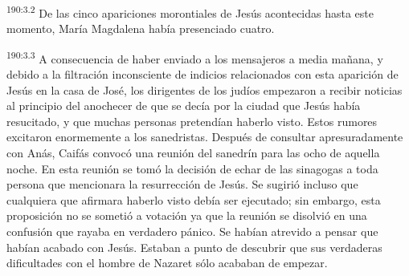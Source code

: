 \par 
\textsuperscript{190:3.2} De las cinco apariciones morontiales de Jesús acontecidas hasta este momento, María Magdalena había presenciado cuatro.

\par 
\textsuperscript{190:3.3} A consecuencia de haber enviado a los mensajeros a media mañana, y debido a la filtración inconsciente de indicios relacionados con esta aparición de Jesús en la casa de José, los dirigentes de los judíos empezaron a recibir noticias al principio del anochecer de que se decía por la ciudad que Jesús había resucitado, y que muchas personas pretendían haberlo visto. Estos rumores excitaron enormemente a los sanedristas. Después de consultar apresuradamente con Anás, Caifás convocó una reunión del sanedrín para las ocho de aquella noche. En esta reunión se tomó la decisión de echar de las sinagogas a toda persona que mencionara la resurrección de Jesús. Se sugirió incluso que cualquiera que afirmara haberlo visto debía ser ejecutado; sin embargo, esta proposición no se sometió a votación ya que la reunión se disolvió en una confusión que rayaba en verdadero pánico. Se habían atrevido a pensar que habían acabado con Jesús. Estaban a punto de descubrir que sus verdaderas dificultades con el hombre de Nazaret sólo acababan de empezar.

